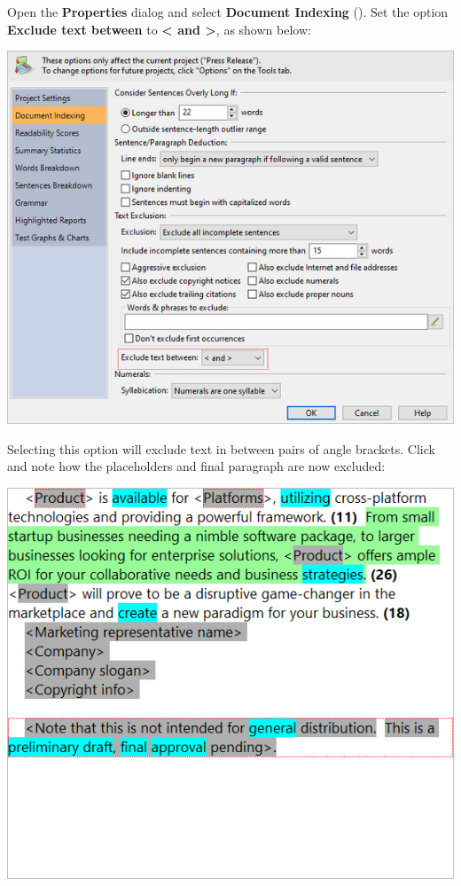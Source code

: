 \documentclass[
]{book}
\theoremstyle{definition}
\theoremstyle{definition}
\theoremstyle{definition}
\theoremstyle{definition}
\theoremstyle{remark}
\begin{document}
Open the \textbf{Properties} dialog and select \textbf{Document Indexing} (). Set the option \textbf{Exclude text between} to \textbf{\textless{} and \textgreater{}}, as shown below:

\includegraphics{Images/ExclusionTagsExampleOptions.png}

Selecting this option will exclude text in between pairs of angle brackets. Click  and note how the placeholders and final paragraph are now excluded:

\begin{center}\includegraphics[width=0.75\linewidth,]{Images/ExclusionTagsExampleExcluding} \end{center}
\end{document}
